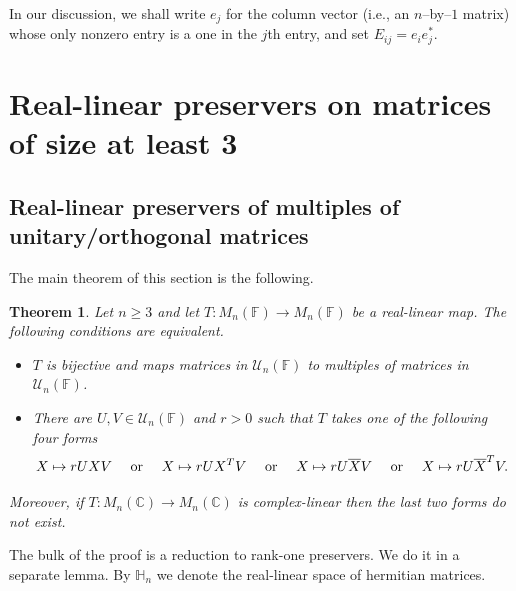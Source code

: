 \documentclass[11pt]{article}
\newtheorem{theorem}{Theorem}[section]
\numberwithin{equation}{section}
\def\IF{{\mathbb F}}
\def\IC{{\mathbb C}}
\def\IH{{\mathbb H}}
\begin{document}
In our discussion, we shall write $e_j$ for the column vector (i.e., an $n$--by--$1$ matrix)
whose only nonzero entry is a one in the $j$th entry, and set $E_{ij} = e_i e_j^*$.

\section{Real-linear preservers on  matrices of size at least 3}

\subsection{Real-linear preservers of multiples of unitary/orthogonal matrices}



The main theorem of this section is the following.


\begin{theorem}\label{thm:main1} Let $n\ge 3$ and let $T\colon M_n(\IF)\to M_n(\IF)$ be a real-linear map.
The following conditions are equivalent.
\begin{itemize}
\item[{\rm (i)}] $T$ is bijective and maps matrices in ${\mathcal U}_n(\IF)$ to multiples of
matrices in ${\mathcal U}_n(\IF)$.
\item[{\rm (ii)}]
There are $U,V\in {\mathcal U}_n(\IF)$ and $r>0$ such that $T$ takes one of the following four forms
      $$X \mapsto rUXV  \quad \hbox{ or } \quad X \mapsto rUX^TV  \quad \hbox{ or } \quad X \mapsto rU\overline{X}V \quad \hbox{ or } \quad X \mapsto rU\overline{X}^TV.$$
    \end{itemize}
      Moreover, if  $T\colon M_n(\IC)\to M_n(\IC)$ is complex-linear then the last two  forms do not exist.
\end{theorem}

The bulk of the proof is a reduction to rank-one preservers. We do it in a separate lemma. By $\IH_n$ we denote the real-linear space of hermitian matrices.
\end{document}
